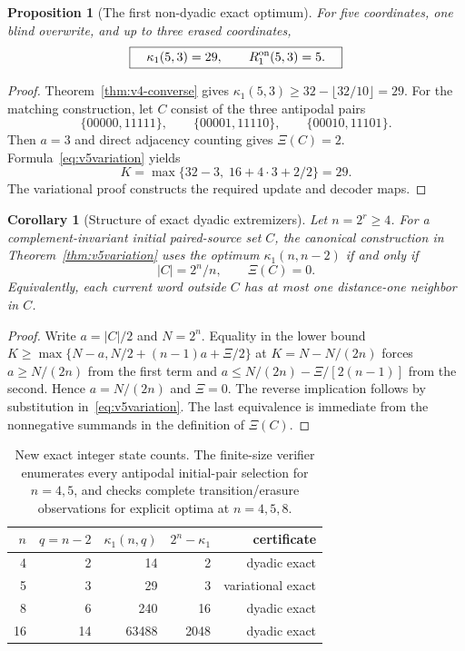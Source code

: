 \documentclass[11pt,a4paper]{article}
\newtheorem{proposition}[theorem]{Proposition}
\newtheorem{corollary}[theorem]{Corollary}
\begin{document}
\begin{proposition}[The first non-dyadic exact optimum]\label{prop:v5n5}
For five coordinates, one blind overwrite, and up to three erased coordinates,
\[
 \boxed{\quad \kappa_1(5,3)=29,\qquad R_1^{\rm on}(5,3)=5.\quad}
\]
\end{proposition}
\begin{proof}
Theorem~\ref{thm:v4-converse} gives $\kappa_1(5,3)\ge32-\lfloor32/10\rfloor=29$. For the matching construction, let $C$ consist of the three antipodal pairs
\[
 \{00000,11111\},\qquad\{00001,11110\},\qquad\{00010,11101\}.
\]
Then $a=3$ and direct adjacency counting gives $\Xi(C)=2$. Formula~\eqref{eq:v5variation} yields
\[
 K=\max\{32-3,\;16+4\cdot3+2/2\}=29.
\]
The variational proof constructs the required update and decoder maps.
\end{proof}

\begin{corollary}[Structure of exact dyadic extremizers]\label{cor:v5structure}
Let $n=2^r\ge4$. For a complement-invariant initial paired-source set $C$, the canonical construction in Theorem~\ref{thm:v5variation} uses the optimum $\kappa_1(n,n-2)$ if and only if
\[
 \boxed{\qquad |C|=2^n/n,\qquad \Xi(C)=0.\qquad}
\]
Equivalently, each current word outside $C$ has at most one distance-one neighbor in $C$.
\end{corollary}
\begin{proof}
Write $a=|C|/2$ and $N=2^n$. Equality in the lower bound $K\ge\max\{N-a,N/2+(n-1)a+\Xi/2\}$ at $K=N-N/(2n)$ forces $a\ge N/(2n)$ from the first term and $a\le N/(2n)-\Xi/[2(n-1)]$ from the second. Hence $a=N/(2n)$ and $\Xi=0$. The reverse implication follows by substitution in~\eqref{eq:v5variation}. The last equivalence is immediate from the nonnegative summands in the definition of $\Xi(C)$.
\end{proof}

\begin{table}[htbp]\centering\small
\begin{tabular}{@{}rrrrr@{}}\toprule
$n$ & $q=n-2$ & $\kappa_1(n,q)$ & $2^n-\kappa_1$ & certificate\\\midrule
4 &2&14&2&dyadic exact\\
5 &3&29&3&variational exact\\
8 &6&240&16&dyadic exact\\
16&14&63488&2048&dyadic exact\\\bottomrule
\end{tabular}
\caption{New exact integer state counts. The finite-size verifier enumerates every antipodal initial-pair selection for $n=4,5$, and checks complete transition/erasure observations for explicit optima at $n=4,5,8$.}\label{tab:v5exact}
\end{table}
\end{document}
